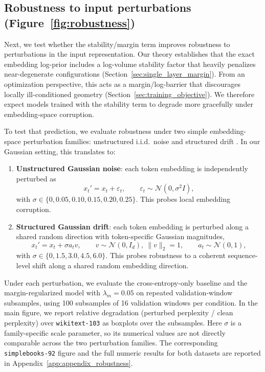 \documentclass[11pt]{article}
\begin{document}
\subsection{Robustness to input perturbations (Figure~\ref{fig:robustness})}
\label{sec:exp_robustness}

Next, we test whether the stability/margin term improves robustness to perturbations in the input representation.
Our theory establishes that the exact embedding log-prior includes a log-volume stability factor that heavily penalizes near-degenerate configurations (Section~\ref{sec:single_layer_margin}). From an optimization perspective, this acts as a margin/log-barrier that discourages locally ill-conditioned geometry (Section~\ref{sec:training_objective}).
We therefore expect models trained with the stability term to degrade more gracefully under embedding-space corruption.

To test that prediction, we evaluate robustness under two simple
embedding-space perturbation families: unstructured i.i.d.\ noise and
structured drift \citep{sahoo2026can}. In our Gaussian setting, this
translates to:
\begin{enumerate}
\item \textbf{Unstructured Gaussian noise}: each token embedding is independently perturbed as
      \[
      x_t' = x_t + \varepsilon_t,
      \qquad
      \varepsilon_t \sim \mathcal{N}(0,\sigma^2 I),
      \]
      with $\sigma \in \{0, 0.05, 0.10, 0.15, 0.20, 0.25\}$. This probes local embedding corruption.
\item \textbf{Structured Gaussian drift}: each token embedding is perturbed along a
      shared random direction with token-specific Gaussian magnitudes,
      \[
      x_t' = x_t + \sigma a_t v,
      \qquad
      v \sim \mathcal{N}(0, I_d), \ \|v\|_2 = 1,
      \qquad
      a_t \sim \mathcal{N}(0,1),
      \]
      with $\sigma \in \{0, 1.5, 3.0, 4.5, 6.0\}$. This probes robustness to a
      coherent sequence-level shift along a shared random embedding direction.
\end{enumerate}
Under each perturbation, we evaluate the cross-entropy-only baseline and the
margin-regularized model with $\lambda_m{=}0.05$ on repeated
validation-window subsamples, using 100 subsamples of 16 validation windows
per condition. In the main figure, we report relative degradation
(perturbed perplexity / clean perplexity) over \texttt{wikitext-103} as boxplots over the subsamples.
Here $\sigma$ is a family-specific scale parameter, so its numerical values are
not directly comparable across the two perturbation families.
The corresponding \texttt{simplebooks-92} figure and the full numeric results
for both datasets are reported in Appendix~\ref{app:appendix_robustness}.
\end{document}
